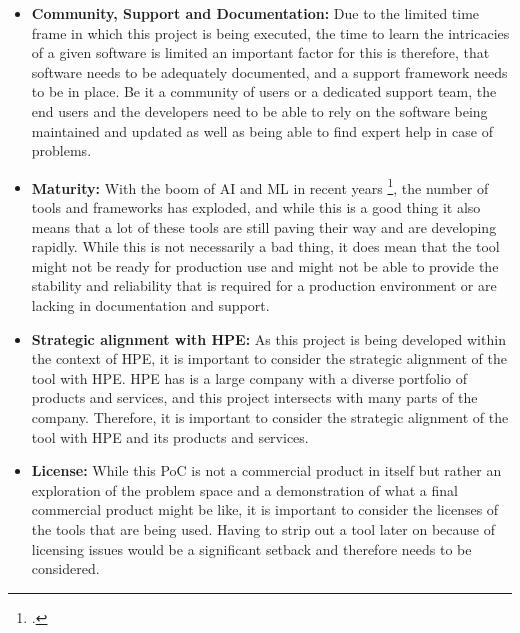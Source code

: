 \begin{itemize}

    \item \textbf{Community, Support and  Documentation:}
        Due to the limited time frame in which this project is being executed, the time to learn the intricacies of a given software is limited an important factor for this is therefore, that software needs to be adequately documented, and a support framework needs to be in place.
        Be it a community of users or a dedicated support team, the end users and the developers need to be able to rely on the software being maintained and updated as well as being able to find expert help in case of problems.

    \item \textbf{Maturity:}
        With the boom of \ac{AI} and \ac{ML} in recent years \footcite{24TopAI}, the number of tools and frameworks has exploded, and while this is a good thing it also means that a lot of these tools are still paving their way and are developing rapidly.
        While this is not necessarily a bad thing, it does mean that the tool might not be ready for production use and might not be able to provide the stability and reliability that is required for a production environment or are lacking in documentation and support.      

    \item \textbf{Strategic alignment with \ac{HPE}:}
        As this project is being developed within the context of \ac{HPE}, it is important to consider the strategic alignment of the tool with \ac{HPE}.
        \ac{HPE} has is a large company with a diverse portfolio of products and services, and this project intersects with many parts of the company.
        Therefore, it is important to consider the strategic alignment of the tool with \ac{HPE} and its products and services.

    \item \textbf{License:}
        \label{crit:license}
        While this \ac{PoC} is not a commercial product in itself but rather an exploration of the problem space and a demonstration of what a final commercial product  might be like,
        it is important to consider the licenses of the tools that are being used.
        Having to strip out a tool later on because of licensing issues would be a significant setback and therefore needs to be considered.


\end{itemize}
